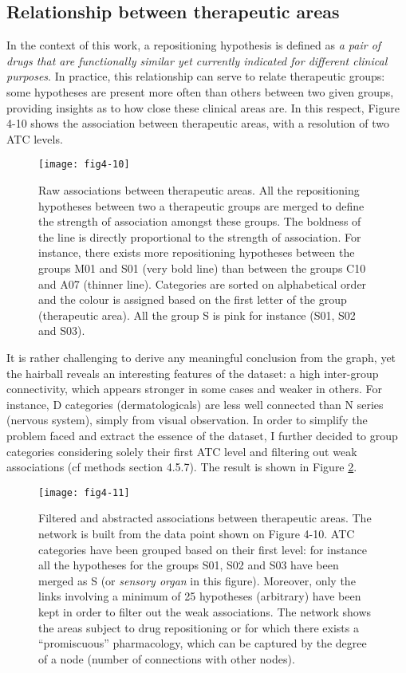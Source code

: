 \subsection{Relationship between therapeutic areas}
In the context of this work, a repositioning hypothesis is defined as \emph{a pair of drugs that are functionally similar yet currently indicated for different clinical purposes}. In practice, this relationship can serve to relate therapeutic groups: some hypotheses are present more often than others between two given groups, providing insights as to how close these clinical areas are. In this respect, Figure 4-10 shows the association between therapeutic areas, with a resolution of two ATC levels.

\begin{figure}[H]
    \centering
    \texttt{[image: fig4-10]}
    \caption{Raw associations between therapeutic areas. All the repositioning hypotheses between two a therapeutic groups are merged to define the strength of association amongst these groups. The boldness of the line is directly proportional to the strength of association. For instance, there exists more repositioning hypotheses between the groups M01 and S01 (very bold line) than between the groups C10 and A07 (thinner line). Categories are sorted on alphabetical order and the colour is assigned based on the first letter of the group (therapeutic area). All the group S is pink for instance (S01, S02 and S03).}
    \label{fig4-10}
\end{figure}

It is rather challenging to derive any meaningful conclusion from the graph, yet the hairball reveals an interesting features of the dataset: a high inter-group connectivity, which appears stronger in some cases and weaker in others. For instance, D categories (dermatologicals) are less well connected than N series (nervous system), simply from visual observation. In order to simplify the problem faced and extract the essence of the dataset, I further decided to group categories considering solely their first ATC level and filtering out weak associations (cf methods section 4.5.7). The result is shown in Figure \ref{fig4-11}.

\begin{figure}[H]
    \centering
    \texttt{[image: fig4-11]}
    \caption{Filtered and abstracted associations between therapeutic areas. The network is built from the data point shown on Figure 4-10. ATC categories have been grouped based on their first level: for instance all the hypotheses for the groups S01, S02 and S03 have been merged as S (or \emph{sensory organ} in this figure). Moreover, only the links involving a minimum of 25 hypotheses (arbitrary) have been kept in order to filter out the weak associations. The network shows the areas subject to drug repositioning or for which there exists a ``promiscuous'' pharmacology, which can be captured by the degree of a node (number of connections with other nodes).}
    \label{fig4-11}
\end{figure}


